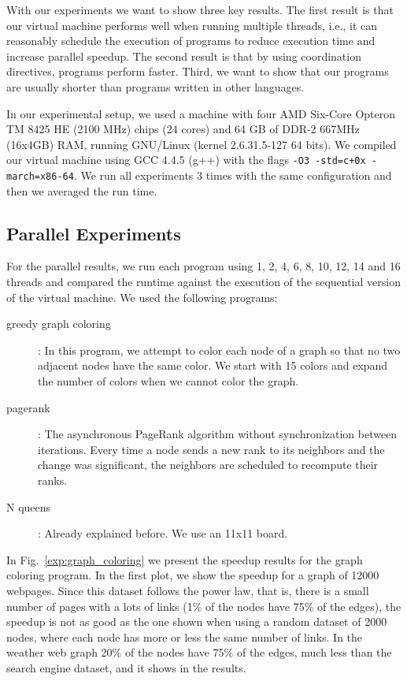 With our experiments we want to show three key results. The first result is that our virtual machine performs well when running multiple threads,
i.e., it can reasonably schedule the execution of programs to reduce execution time and increase parallel speedup. The second result is that by using coordination directives, programs perform faster. Third, we want to show that our programs are usually shorter than programs written in other languages.  

In our experimental setup, we used a machine with
four AMD Six-Core Opteron TM 8425 HE (2100 MHz) chips (24 cores) and 64 GB of DDR-2 667MHz (16x4GB) RAM,
     running GNU/Linux (kernel 2.6.31.5-127 64 bits).
     We compiled our virtual machine using GCC 4.4.5 (g++) with the flags \texttt{-O3 -std=c+0x -march=x86-64}.
     We run all experiments 3 times with the same configuration and then we averaged the run time.

\subsection{Parallel Experiments}

For the parallel results, we run each program using 1, 2, 4, 6, 8, 10, 12, 14 and 16 threads and compared the runtime against the execution of the sequential version of the virtual machine. We used the following programs:

\begin{description}
   \item[greedy graph coloring]: In this program, we attempt to color each node of a graph so that no two adjacent nodes have the same color. We start with 15 colors and expand the number of colors when we cannot color the graph.
   \item[pagerank]: The asynchronous PageRank algorithm without synchronization between iterations. Every time a node sends a new rank to its neighbors and the change was significant, the neighbors are scheduled to recompute their ranks.
   \item[N queens]: Already explained before. We use an 11x11 board.
\end{description}

In Fig.~\ref{exp:graph_coloring} we present the speedup results for the graph coloring program. In the first plot, we show the speedup for a graph of 12000 webpages. Since this dataset follows the power law, that is, there is a small number of pages with a lots of links (1\% of the nodes have 75\% of the edges), the speedup is not as good as the one shown when using a random dataset of 2000 nodes, where each node has more or less the same number of links. In the weather web graph 20\% of the nodes have 75\% of the edges, much less than the search engine dataset, and it shows in the results.

